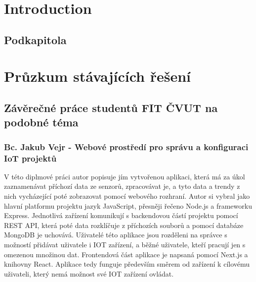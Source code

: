 \chapter*{Introduction}
\setcounter{page}{1}



\section{Podkapitola}


\chapter{Průzkum stávajících řešení}

\section{Závěrečné práce studentů FIT ČVUT na podobné téma}

\subsection{Bc. Jakub Vejr - Webové prostředí pro správu a konfiguraci IoT projektů}

V této diplmové práci autor popisuje jím vytvořenou aplikaci, která má za úkol zaznamenávat příchozí data ze senzorů, zpracovávat je, a tyto data a trendy z nich vycházející poté zobrazovat pomocí webového rozhraní. Autor si vybral jako hlavní platformu projektu jazyk JavaScript, přesněji řečeno Node.js a frameworku Express. Jednotlivá zařízení komunikují s backendovou částí projektu pomocí REST API, která poté data rozklíčuje z příchozích souborů a pomocí databáze MongoDB je uchovává. Uživatelé této aplikace jsou rozděleni na správce s možností přidávat uživatele i IOT zařízení, a běžné uživatele, kteří pracují jen s omezenou množinou dat. Frontendová část aplikace je napsaná pomocí Next.js a knihovny React. Aplikace tedy funguje především směrem od zařízení k cílovému uživateli, který nemá možnost své IOT zařízení ovládat. 

